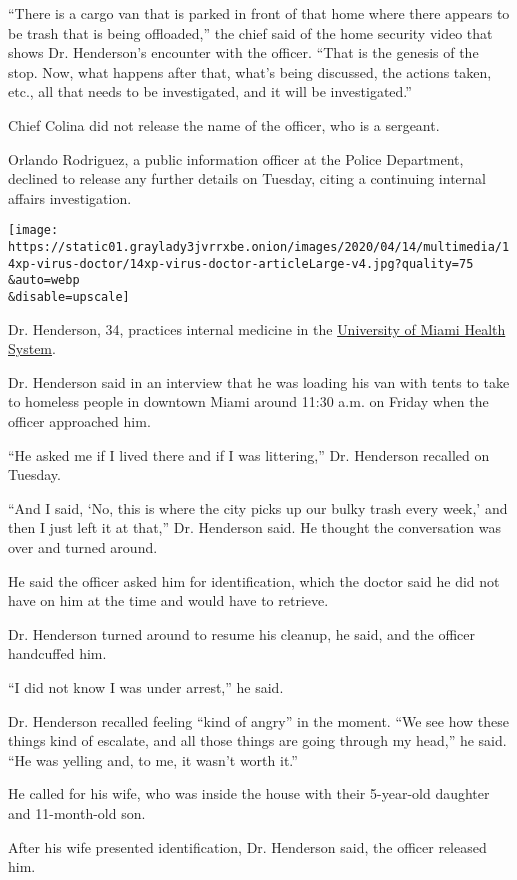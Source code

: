 ``There is a cargo van that is parked in front of that home where there
appears to be trash that is being offloaded,'' the chief said of the
home security video that shows Dr. Henderson's encounter with the
officer. ``That is the genesis of the stop. Now, what happens after
that, what's being discussed, the actions taken, etc., all that needs to
be investigated, and it will be investigated.''

Chief Colina did not release the name of the officer, who is a sergeant.

Orlando Rodriguez, a public information officer at the Police
Department, declined to release any further details on Tuesday, citing a
continuing internal affairs investigation.

\texttt{[image: https://static01.graylady3jvrrxbe.onion/images/2020/04/14/multimedia/14xp-virus-doctor/14xp-virus-doctor-articleLarge-v4.jpg?quality=75\\\&auto=webp\\\&disable=upscale]}

Dr. Henderson, 34, practices internal medicine in the
\href{https://doctors.umiamihealth.org/provider/Armen+Henderson/525783}{University
of Miami Health System}.

Dr. Henderson said in an interview that he was loading his van with
tents to take to homeless people in downtown Miami around 11:30 a.m. on
Friday when the officer approached him.

``He asked me if I lived there and if I was littering,'' Dr. Henderson
recalled on Tuesday.

``And I said, `No, this is where the city picks up our bulky trash every
week,' and then I just left it at that,'' Dr. Henderson said. He thought
the conversation was over and turned around.

He said the officer asked him for identification, which the doctor said
he did not have on him at the time and would have to retrieve.

Dr. Henderson turned around to resume his cleanup, he said, and the
officer handcuffed him.

``I did not know I was under arrest,'' he said.

Dr. Henderson recalled feeling ``kind of angry'' in the moment. ``We see
how these things kind of escalate, and all those things are going
through my head,'' he said. ``He was yelling and, to me, it wasn't worth
it.''

He called for his wife, who was inside the house with their 5-year-old
daughter and 11-month-old son.

After his wife presented identification, Dr. Henderson said, the officer
released him.

